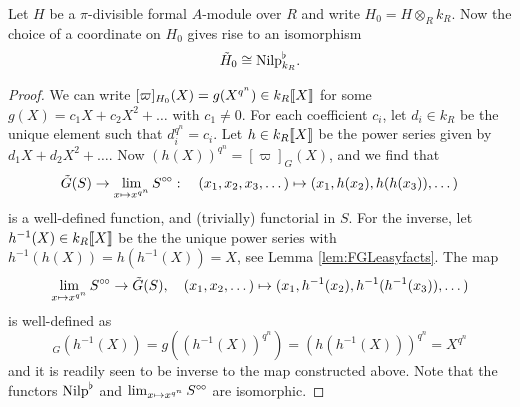 \begin{lem}
  Let $H$ be a $\pi$-divisible formal $A$-module over $R$ and write $H_0 = H
  \otimes_R k_R$. Now the choice of a coordinate on $H_0$ gives rise to an
  isomorphism
  \begin{equation*}
    \tilde H_0 \cong {\mathrm{Nilp}}^\flat_{k_R}.
  \end{equation*}
\begin{proof}
  We can write $[\varpi]_{H_0}(X) = g(X^{q^n}) \in k_R\llbracket X \rrbracket$ for some 
  $g(X) = c_1X + c_2X^2 + \dots$ with $c_1 \neq 0$. For each coefficient $c_i$, let
  $d_i \in k_R$ be the unique element such that $d_i^{q^n} = c_i$. Let
  $h \in k_R\llbracket X \rrbracket$ be the power series given by $d_1 X + d_2
  X^2 + \dots$. Now $(h(X))^{q^n}=[\varpi]_G(X)$, and we find that 
  \begin{equation*}
      \tilde G(S) \to \lim_{x \mapsto x^{q^n}} S^{\circ \hspace{-0.5pt} \circ}: \quad
      (x_1, x_2, x_3, \dots) \mapsto (x_1, h(x_2), h(h(x_3)), \dots)
  \end{equation*}
  is a well-defined function, and (trivially) functorial in $S$. For the
  inverse, let $h^{-1}(X) \in k_R\llbracket X \rrbracket$ be the the unique power
  series with $h^{-1}(h(X))= h(h^{-1}(X)) = X$, see Lemma
  \ref{lem:FGLeasyfacts}. The map
  \begin{equation*}
      \lim_{x \mapsto x^{q^n}} S^{\circ \hspace{-0.5pt} \circ} \to \tilde G(S), \quad 
      (x_1, x_2, \dots ) \mapsto (x_1, h^{-1}(x_2), h^{-1}(h^{-1}(x_3)), \dots)
  \end{equation*}
  is well-defined as
  \begin{equation*}
      [\varpi]_G(h^{-1}(X)) = g((h^{-1}(X))^{q^n}) = (h(h^{-1}(X)))^{q^n} =
      X^{q^n}
  \end{equation*}
  and it is readily seen to be inverse to the map constructed above.
  Note that the functors ${\mathrm{Nilp}}^\flat$ and $\lim_{x \mapsto x^{q^n}} S^{\circ \hspace{-0.5pt} \circ}$
  are isomorphic.
\end{proof}
\end{lem}

